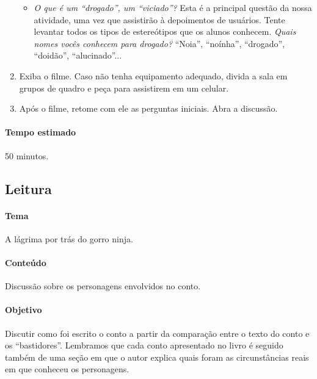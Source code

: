 \documentclass[11pt]{extarticle}
\begin{document}
\begin{enumerate}
\begin{itemize}
			\item \textit{O que é um ``drogado'', um ``viciado''?} Esta é a principal 
			questão da nossa atividade, uma vez que assistirão à depoimentos de 
			usuários. Tente levantar todos os tipos de estereótipos 
			que os alunos conhecem. \textit{Quais nomes vocês conhecem para drogado?}
			``Noia'', ``noínha'', ``drogado'', ``doidão'', ``alucinado''...
		\end{itemize}

		\item Exiba o filme. Caso não tenha equipamento adequado, divida a sala em grupos de quadro
		e peça para assistirem em um celular. 
		
		\item Após o filme, retome com ele as perguntas iniciais. Abra a discussão. 
		
    \end{enumerate}

	\paragraph{Tempo estimado} 50 minutos. 




\subsection{Leitura} 


\paragraph{Tema} A lágrima por trás do gorro ninja.

\paragraph{Conteúdo} Discussão sobre os personagens envolvidos no conto. 

\paragraph{Objetivo} Discutir como foi escrito o conto a partir da comparação entre 
o texto do conto e os ``bastidores''. Lembramos que cada conto apresentado no 
livro é seguido também de uma seção em que o autor explica quais foram as 
circunstâncias reais em que conheceu os personagens. 
\end{document}
